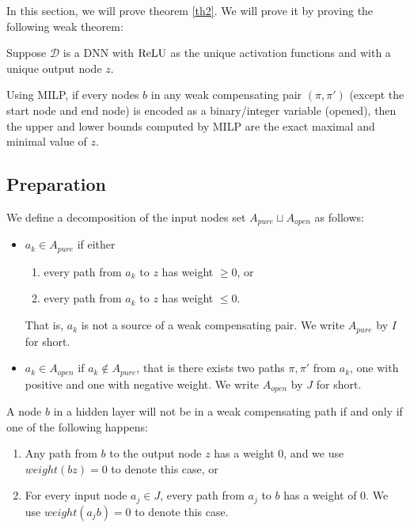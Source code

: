 			In this section, we will prove theorem \ref{th2}. We will prove it by proving the following weak theorem:
			
			\begin{theorem} \label{thm:2}
				
				
				Suppose $\mathcal{D}$ is a DNN with $\mathrm{ReLU}$ as the unique activation functions and with a unique output node $z$.
				
				Using MILP, if every nodes $b$ in any weak compensating pair
				$(\pi,\pi')$ (except the start node and end node) is encoded as a binary/integer variable (opened), then the upper and lower 
				bounds computed by MILP are the exact maximal and minimal value of $z$.
			\end{theorem}
			
			
			\subsection{Preparation}
			
			
			
			
			\begin{definition}
				We define a decomposition of the input nodes set $A_{pure}\sqcup A_{open}$ as follows:  
				\begin{itemize}
					\item $a_k \in A_{pure}$  if either
					\begin{enumerate}
						\item every path from $a_k$ to $z$ has weight $\geq 0$, or
						\item every path from $a_k$ to $z$ has weight $\leq 0$. 
						
					\end{enumerate}
					That is, $a_k$ is not a source of a weak compensating pair. 	We write $A_{pure}$ by $I$ for short.
					\item $a_k \in A_{open}$ if $a_k \notin A_{pure}$, that is there exists two paths $\pi,\pi'$ from $a_k$, 
					one with positive and one with negative weight. 	We write $A_{open}$ by $J$ for short.
				\end{itemize}
			\end{definition} 
			
			
			
			\begin{lemma} \label{lem:open_node_2}
				A node $b$ in a hidden layer will not be in a weak compensating path if and only if one of the following happens:
				\begin{enumerate}
					\item Any path from $b$ to the output node $z$ has a weight $0$, and we use $weight({bz})=0$ to denote this case, or
					\item For every input node $a_j\in J$, every path from $a_j$ to $b$ has a weight of $0$. We use $weight({a_jb})=0$ to denote this case.
				\end{enumerate}
				
			\end{lemma}
			
